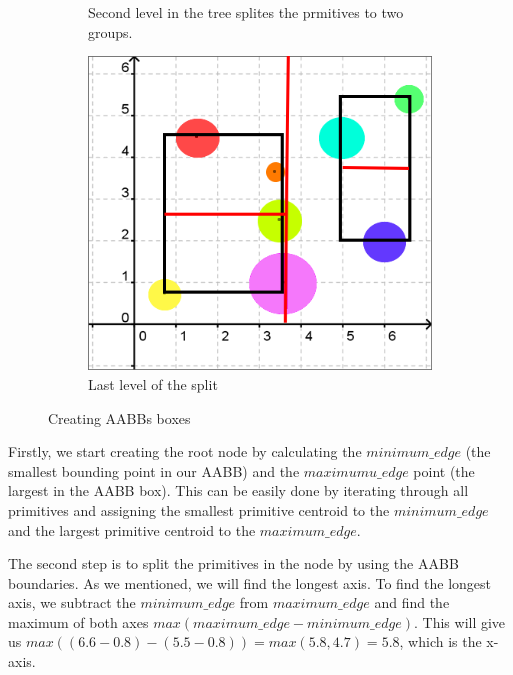 \documentclass[11pt,a4paper]{article}
\begin{document}
\begin{figure}[h]
\begin{subfigure}[b]{0.3\textwidth}
         \caption{Second level in the tree splites the prmitives to two groups.}
         \label{fig:pi_5000}
     \end{subfigure}
     \hfill
     \begin{subfigure}[b]{0.3\textwidth}
         \centering
         \includegraphics[width=\textwidth]{images/example_bvh/4.png}
         \caption{Last level of the split}
         \label{fig:pi_18000}
     \end{subfigure}
        \caption{Creating AABBs boxes}
        \label{fig:three graphs}
\end{figure}

Firstly, we start creating the root node by calculating the $minimum\_edge$ (the smallest bounding point in our AABB) and the $maximumu\_edge$ point (the largest in the AABB box). This can be easily done by iterating through all primitives and assigning the smallest primitive centroid to the  $minimum\_edge$ and the largest primitive centroid to the $maximum\_edge$.
\\
\noindent

The second step is to split the primitives in the node by using the AABB boundaries. As we mentioned, we will find the longest axis.
To find the longest axis, we subtract the $minimum\_edge$ from $maximum\_edge $ and find the maximum of both axes $max(maximum\_edge - minimum\_edge)$. This will give us $max((6.6-0.8) - (5.5-0.8)) = max(5.8,4.7) = 5.8$, which is the x-axis. 
\\
\noindent
\end{document}
